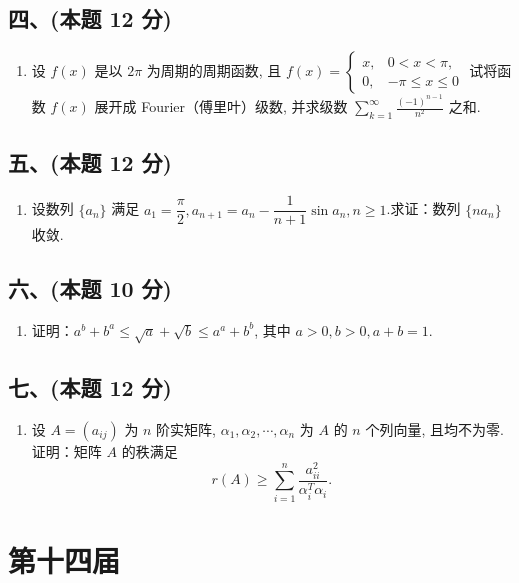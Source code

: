 \subsection*{四、(本题 12 分)}
\begin{enumerate}[start=8]
    \item 设 $f(x)$ 是以 $2\pi$ 为周期的周期函数, 且 $f(x) = \begin{cases}
                  x, & 0 < x < \pi,       \\
                  0, & -\pi \leq x \leq 0
              \end{cases}$ 试将函数 $f(x)$ 展开成 Fourier（傅里叶）级数, 并求级数 $\displaystyle\sum_{k=1}^{\infty} \frac{(-1)^{n-1}}{n^2}$ 之和.
\end{enumerate}

\subsection*{五、(本题 12 分)}
\begin{enumerate}[start=9]
    \item 设数列 $\{a_n\}$ 满足 $a_1 = \dfrac{\pi}{2}, a_{n+1} = a_n - \dfrac{1}{n+1} \sin a_n, n \geqslant 1$.求证：数列 $\{na_n\}$ 收敛.
\end{enumerate}

\subsection*{六、(本题 10 分)}
\begin{enumerate}[start=10]
    \item 证明：$a^b + b^a \leqslant \sqrt{a} + \sqrt{b} \leqslant a^a + b^b$, 其中 $a > 0, b > 0, a + b = 1$.
\end{enumerate}

\subsection*{七、(本题 12 分)}
\begin{enumerate}[start=11]
    \item 设 $A = (a_{ij})$ 为 $n$ 阶实矩阵, $\alpha_1, \alpha_2, \cdots, \alpha_n$ 为 $A$ 的 $n$ 个列向量, 且均不为零.证明：矩阵 $A$ 的秩满足
          \[
              r(A) \geqslant \sum_{i=1}^{n} \frac{a_{ii}^2}{\alpha_i^T \alpha_i}.
          \]
\end{enumerate}


\newpage
\section{第十四届}


